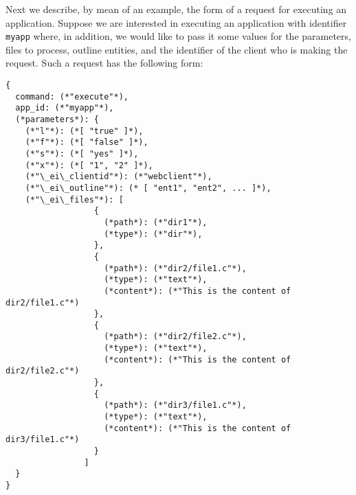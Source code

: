 Next we describe, by mean of an example, the form of a request for
executing an application. Suppose we are interested in executing an
application with identifier \texttt{myapp} where, in addition, we
would like to pass it some values for the parameters, files to
process, outline entities, and the identifier of the client who is
making the request. Such a request has the following form:

\bigskip
\begin{lstlisting}
{
  command: (*"execute"*),
  app_id: (*"myapp"*),
  (*parameters*): {
    (*"l"*): (*[ "true" ]*),
    (*"f"*): (*[ "false" ]*),
    (*"s"*): (*[ "yes" ]*),
    (*"x"*): (*[ "1", "2" ]*), 
    (*"\_ei\_clientid"*): (*"webclient"*),
    (*"\_ei\_outline"*): (* [ "ent1", "ent2", ... ]*),
    (*"\_ei\_files"*): [
                  {
                    (*path*): (*"dir1"*),
                    (*type*): (*"dir"*),
                  },
                  {
                    (*path*): (*"dir2/file1.c"*),
                    (*type*): (*"text"*),
                    (*content*): (*"This is the content of dir2/file1.c"*)
                  },
                  {
                    (*path*): (*"dir2/file2.c"*),
                    (*type*): (*"text"*),
                    (*content*): (*"This is the content of dir2/file2.c"*)
                  },
                  {
                    (*path*): (*"dir3/file1.c"*),
                    (*type*): (*"text"*),
                    (*content*): (*"This is the content of dir3/file1.c"*)
                  }
                ]
  }
}
\end{lstlisting}

